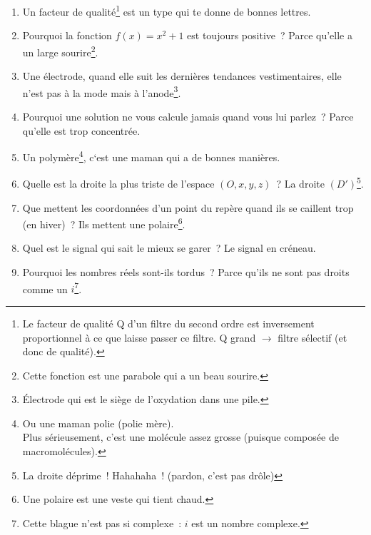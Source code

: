 \documentclass[10pt,a5paper,fullpage]{book}
\begin{document}
\begin{enumerate}
		\item Un facteur de qualité\footnote{Le facteur de qualité Q d’un filtre du second ordre est inversement proportionnel à ce que laisse passer ce filtre. Q grand $\rightarrow$ filtre sélectif (et donc de qualité).} est un type qui te donne de bonnes lettres.
		\item Pourquoi la fonction $f(x) = x^2 + 1$ est toujours positive~? Parce qu’elle a un large sourire\footnote{Cette fonction est une parabole qui a un beau sourire.}.
		\item Une électrode, quand elle suit les dernières tendances vestimentaires, elle n’est pas à la mode mais à l’anode\footnote{Électrode qui est le siège de l’oxydation dans une pile.}.
		\item Pourquoi une solution ne vous calcule jamais quand vous lui parlez~? Parce qu'elle est trop concentrée.
		\item Un polymère\footnote{Ou une maman polie (polie mère). \\Plus sérieusement, c’est une molécule assez grosse (puisque composée de macromolécules).}, c‘est une maman qui a de bonnes manières.
		\item Quelle est la droite la plus triste de l’espace ${(O,x,y,z)}$~? La droite $(D')$\footnote{La droite déprime~! Hahahaha~! \tiny{(pardon, c'est pas drôle)}}. 
		\item Que mettent les coordonnées d’un point du repère quand ils se caillent trop (en hiver)~? Ils mettent une polaire\footnote{Une polaire est une veste qui tient chaud.}.
		\item Quel est le signal qui sait le mieux se garer~? Le signal en créneau.
		\item Pourquoi les nombres réels sont-ils tordus~? Parce qu’ils ne sont pas droits comme un $i$\footnote{Cette blague n'est pas si complexe~: $i$ est un nombre complexe.}. \\

\end{enumerate}
\end{document}
